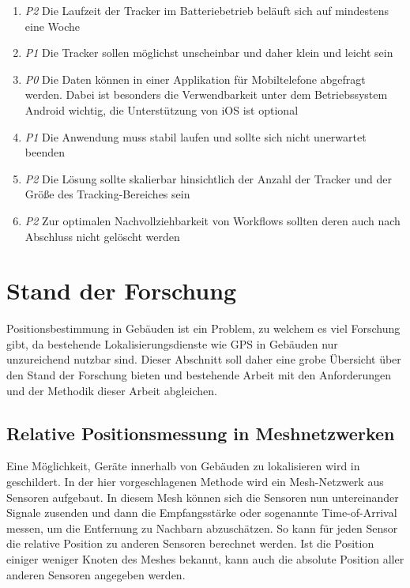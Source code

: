\begin{enumerate}[label=\textbf{NF-\arabic*}]
	\item \label{nf:akku} \textit{P2}  Die Laufzeit der Tracker im Batteriebetrieb beläuft sich auf mindestens eine Woche
	\item \label{nf:klein} \textit{P1}  Die Tracker sollen möglichst unscheinbar und daher klein und leicht sein
	\item \label{nf:app} \textit{P0}  Die Daten können in einer Applikation für Mobiltelefone abgefragt werden.  Dabei ist besonders die Verwendbarkeit unter dem Betriebssystem Android wichtig, die Unterstützung von iOS ist optional
	\item \label{nf:stabilität} \textit{P1}  Die Anwendung muss stabil laufen und sollte sich nicht unerwartet beenden
	\item \label{nf:skalierbarkeit} \textit{P2}  Die Lösung sollte skalierbar hinsichtlich der Anzahl der Tracker und der Größe des Tracking-Bereiches sein
	\item \label{nf:nachvollziehbarkeit} \textit{P2}  Zur optimalen Nachvollziehbarkeit von Workflows sollten deren auch nach Abschluss nicht gelöscht werden
\end{enumerate}

\section{Stand der Forschung} \label{sec:stand-der-forschung}

Positionsbestimmung in Gebäuden ist ein Problem, zu welchem es viel Forschung gibt, da bestehende
Lokalisierungsdienste wie \gls{GPS} in Gebäuden nur unzureichend nutzbar sind. Dieser Abschnitt soll
daher eine grobe Übersicht über den Stand der Forschung bieten und bestehende Arbeit mit den
Anforderungen und der Methodik dieser Arbeit abgleichen.

\subsection{Relative Positionsmessung in Meshnetzwerken}

Eine Möglichkeit, Geräte innerhalb von Gebäuden zu lokalisieren wird in \cite{Patwari2003}
geschildert. In der hier vorgeschlagenen Methode wird ein \gls{Mesh-Netzwerk} aus Sensoren aufgebaut.
In diesem Mesh können sich die Sensoren nun untereinander Signale zusenden und dann die
Empfangsstärke oder sogenannte Time-of-Arrival messen, um die Entfernung zu Nachbarn abzuschätzen.
So kann für jeden Sensor die relative Position zu anderen Sensoren berechnet werden.
Ist die Position einiger weniger Knoten des Meshes bekannt, kann auch die absolute Position aller
anderen Sensoren angegeben werden.

